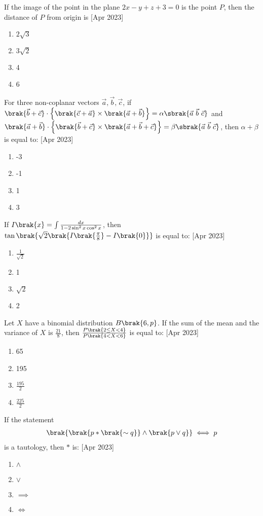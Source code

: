 \item If the image of the point  in the plane $2x - y + z + 3 = 0$ is the point $P$, then the distance of $P$ from origin is \hfill[Apr 2023]
\begin{enumerate}
    \item $2\sqrt{3}$
    \item $3\sqrt{2}$
    \item 4
    \item 6 \\
\end{enumerate}
\item For three non-coplanar vectors $\vec{a}, \vec{b}, \vec{c}$, if $\brak{\vec{b}+\vec{c}}\cdot\left\{\brak{\vec{c}+\vec{a}}\times\brak{\vec{a}+\vec{b}}\right\} = \alpha\sbrak{\vec{a}\ \vec{b}\ \vec{c}}$ and $\brak{\vec{a}+\vec{b}}\cdot\left\{\brak{\vec{b}+\vec{c}}\times\brak{\vec{a}+\vec{b}+\vec{c}}\right\} = \beta\sbrak{\vec{a}\ \vec{b}\ \vec{c}}$, then $\alpha+\beta$ is equal to: \hfill[Apr 2023]
\begin{enumerate}
    \item -3
    \item -1
    \item 1
    \item 3 \\
\end{enumerate}
\item If $I\brak{x} = \int \frac{dx}{1 - 2\sin^2x\cos^2x}$, then $\tan\brak{\sqrt{2}\brak{I\brak{\frac{\pi}{8}} - I\brak{0}}}$ is equal to: \hfill[Apr 2023]
\begin{enumerate}
    \item $\frac{1}{\sqrt{2}}$
    \item 1
    \item $\sqrt{2}$
    \item 2 \\
\end{enumerate}
\item Let $X$ have a binomial distribution $B\brak{6,p}$. If the sum of the mean and the variance of $X$ is $\frac{21}{8}$, then $\frac{P\brak{2 \leq X < 4}}{P\brak{4 < X < 6}}$ is equal to: \hfill[Apr 2023]
\begin{enumerate}
   \item 65
   \item 195
   \item $\frac{195}{2}$
   \item $\frac{225}{2}$ \\
\end{enumerate}
\item If the statement 
\begin{align*}
    \brak{\brak{p*\brak{\sim q}}\land\brak{p \lor q}} \iff p
\end{align*}
is a tautology, then $*$ is: \hfill[Apr 2023]
\begin{enumerate}
    \item $\land$
    \item $\lor$
    \item $\implies$
    \item $\iff$ \\
\end{enumerate}
 
